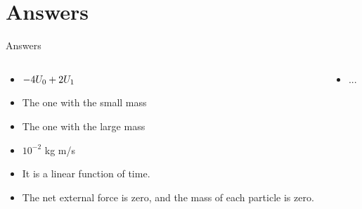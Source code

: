 \documentclass{beamer}
\begin{document}
\section{Answers}

\begin{frame}{Answers}
\begin{columns}[T]
\begin{column}{0.5\textwidth}
\begin{itemize}
\item $-4U_{\rm 0} + 2U_{\rm 1}$
\item The one with the small mass
\item The one with the large mass
\item $10^{-2}$ kg m/s
\item It is a linear function of time.
\item The net external force is zero, and the mass of each particle is zero.
\end{itemize}
\end{column}
\begin{column}{0.5\textwidth}
\begin{itemize}
\item ...
\end{itemize}
\end{column}
\end{columns}
\end{frame}
\end{document}
